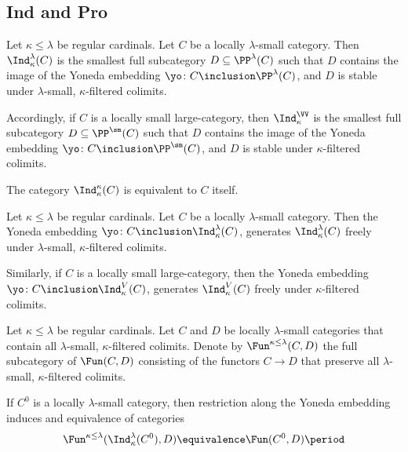 \subsection{Ind and Pro}%
\label{sub:ind_and_pro}

\begin{definition}
	Let $ \kappa \leq \lambda $ be regular cardinals.
	Let $ C $ be a locally $ \lambda $-small category.
	Then $ \Ind_{\kappa}^{\lambda}(C) $ is
	the smallest full subcategory $ D \subseteq \PP^{\lambda}(C) $
	such that $ D $ contains the image
	of the Yoneda embedding
	$ \yo \colon C \inclusion \PP^{\lambda}(C) $,
	and $ D $ is stable under
	$ \lambda $-small, $ \kappa $-filtered colimits.

	Accordingly, if $ C $ is a locally small large-category,
	then $ \Ind_{\kappa}^{\VV} $ is
	the smallest full subcategory $ D \subseteq \PP^{\sm}(C) $
	such that $ D $ contains the image
	of the Yoneda embedding
	$ \yo \colon C \inclusion \PP^{\sm}(C) $,
	and $ D $ is stable under $ \kappa $-filtered colimits.
\end{definition}

\begin{eg}
	The category $ \Ind_{\kappa}^{\kappa}(C) $ is
	equivalent to $ C $ itself.
\end{eg}

\begin{proposition}
	Let $ \kappa \leq \lambda $ be regular cardinals.
	Let $ C $ be a locally $ \lambda $-small category.
	Then the Yoneda embedding
	$ \yo \colon C \inclusion \Ind_{\kappa}^{\lambda}(C) $,
	generates $ \Ind_{\kappa}^{\lambda}(C) $ freely under
	$ \lambda $-small, $ \kappa $-filtered colimits.

	Similarly, if $ C $ is a locally small large-category,
	then the Yoneda embedding
	$ \yo \colon C \inclusion \Ind_{\kappa}^{V}(C) $,
	generates $ \Ind_{\kappa}^V(C) $ freely under
	$ \kappa $-filtered colimits.
\end{proposition}

\begin{notation}
	Let $ \kappa \leq \lambda $ be regular cardinals.
	Let $ C $ and $ D $  be locally $ \lambda $-small categories
	that contain all $ \lambda $-small, $ \kappa $-filtered colimits.
	Denote by $ \Fun^{\kappa \leq \lambda}(C, D) $
	the full subcategory of $ \Fun(C,D) $ consisting of
	the functors $ C \to D $ that preserve all 
	$ \lambda $-small, $ \kappa $-filtered colimits.

	If $ C^0 $ is a locally $ \lambda $-small category,
	then restriction along the Yoneda embedding
	induces and equivalence of categories
	\[
		\Fun^{\kappa \leq \lambda}(\Ind_{\kappa}^{\lambda}(C^0), D)
		\equivalence \Fun(C^0, D) \period
	\]
\end{notation}


